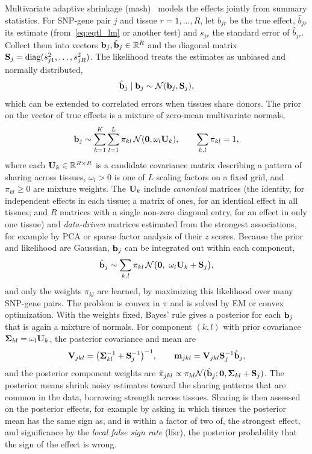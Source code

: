 Multivariate adaptive shrinkage (mash)~\citep{urbut2019} models the effects jointly from summary statistics. For SNP-gene pair $j$ and tissue $r=1,\dots,R$, let $b_{jr}$ be the true effect, $\hat b_{jr}$ its estimate (from~\eqref{eq:eqtl_lm} or another test) and $s_{jr}$ the standard error of $\hat b_{jr}$. Collect them into vectors $\mathbf{b}_j,\hat{\mathbf{b}}_j\in\mathbb{R}^R$ and the diagonal matrix $\mathbf{S}_j=\operatorname{diag}(s_{j1}^2,\dots,s_{jR}^2)$. The likelihood treats the estimates as unbiased and normally distributed,
\begin{equation}
  \hat{\mathbf{b}}_j\mid\mathbf{b}_j \sim \mathcal{N}(\mathbf{b}_j,\mathbf{S}_j),
\end{equation}
which can be extended to correlated errors when tissues share donors. The prior on the vector of true effects is a mixture of zero-mean multivariate normals,
\begin{equation}
  \mathbf{b}_j \sim \sum_{k=1}^K\sum_{l=1}^L \pi_{kl}\,\mathcal{N}(\mathbf{0},\omega_l\mathbf{U}_k), \qquad \sum_{k,l}\pi_{kl}=1,
  \label{eq:mash_prior}
\end{equation}
where each $\mathbf{U}_k\in\mathbb{R}^{R\times R}$ is a candidate covariance matrix describing a pattern of sharing across tissues, $\omega_l>0$ is one of $L$ scaling factors on a fixed grid, and $\pi_{kl}\geq0$ are mixture weights. The $\mathbf{U}_k$ include \emph{canonical} matrices (the identity, for independent effects in each tissue; a matrix of ones, for an identical effect in all tissues; and $R$ matrices with a single non-zero diagonal entry, for an effect in only one tissue) and \emph{data-driven} matrices estimated from the strongest associations, for example by PCA or sparse factor analysis of their $z$ scores. Because the prior and likelihood are Gaussian, $\mathbf{b}_j$ can be integrated out within each component,
\begin{equation}
  \vbhat_j \sim \sum_{k,l}\pi_{kl}\,\Normal\big(\vzero,\ \omega_l\mU_k+\mS_j\big),
\end{equation}
and only the weights $\pi_{kl}$ are learned, by maximizing this likelihood over many SNP-gene pairs. The problem is convex in $\pi$ and is solved by EM or convex optimization. With the weights fixed, Bayes' rule gives a posterior for each $\mathbf{b}_j$ that is again a mixture of normals. For component $(k,l)$ with prior covariance $\boldsymbol{\Sigma}_{kl}=\omega_l\mathbf{U}_k$, the posterior covariance and mean are
\begin{equation}
  \mathbf{V}_{jkl} = \big(\boldsymbol{\Sigma}_{kl}^{-1}+\mathbf{S}_j^{-1}\big)^{-1}, \qquad \mathbf{m}_{jkl} = \mathbf{V}_{jkl}\mathbf{S}_j^{-1}\hat{\mathbf{b}}_j,
\end{equation}
and the posterior component weights are $\tilde\pi_{jkl}\propto\pi_{kl}\mathcal{N}(\hat{\mathbf{b}}_j;\mathbf{0},\boldsymbol{\Sigma}_{kl}+\mathbf{S}_j)$. The posterior means shrink noisy estimates toward the sharing patterns that are common in the data, borrowing strength across tissues. Sharing is then assessed on the posterior effects, for example by asking in which tissues the posterior mean has the same sign as, and is within a factor of two of, the strongest effect, and significance by the \emph{local false sign rate} (lfsr), the posterior probability that the sign of the effect is wrong.

